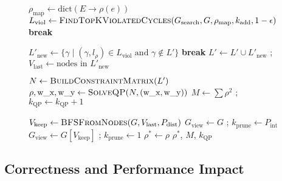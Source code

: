 \documentclass{article}
\begin{document}
\begin{figure*}[htbp!]
\begin{algorithm}[H]
\begin{algorithmic}[1]
                    \State $\rho_{\text{map}} \gets \text{dict}(E \to \rho(e))$ 
                    \State $L_{\text{viol}} \gets \Call{FindTopKViolatedCycles}{G_{\text{search}}, G, \rho_{\text{map}}, k_{\text{add}}, 1 - \epsilon}$ \label{line:find_cycles_compact}
                     \textbf{break} \EndIf {}

                    \State $L'_{\text{new}} \gets \{\gamma \mid (\gamma, l_\rho) \in L_{\text{viol}} \text{ and } \gamma \notin L'\}$ 
                     \textbf{break} \EndIf {}
                    \State $L' \gets L' \cup L'_{\text{new}}$ ; $V_{\text{last}} \gets \text{nodes in } L'_{\text{new}}$

                    \State $N \gets \Call{BuildConstraintMatrix}{L'}$ 
                    \State $\rho, \text{w\_x}, \text{w\_y} \gets \Call{SolveQP}{N, (\text{w\_x}, \text{w\_y})}$
                    \State $M \gets \sum \rho^2$ ; $k_{\text{QP}} \gets k_{\text{QP}} + 1$

                     \label{line:prune_update_compact} 
                         \State $V_{\text{keep}} \gets \Call{BFSFromNodes}{G, V_{\text{last}}, P_{\text{dist}}}$
                          $G_{\text{view}} \gets G$ ; $k_{\text{prune}} \gets P_{\text{int}}$ 
                         \Else $G_{\text{view}} \gets G[V_{\text{keep}}]$ ; $k_{\text{prune}} \gets 1$
                         \EndIf
                    \EndIf
                \EndWhile
                \State $\rho^* \gets \rho$
                \State \Return $\rho^*$, $M$, $k_{\text{QP}}$
            \end{algorithmic}
        \end{algorithm}
\end{figure*}

\subsection{Correctness and Performance Impact}
\label{subsec:correctness_performance}
\end{document}

